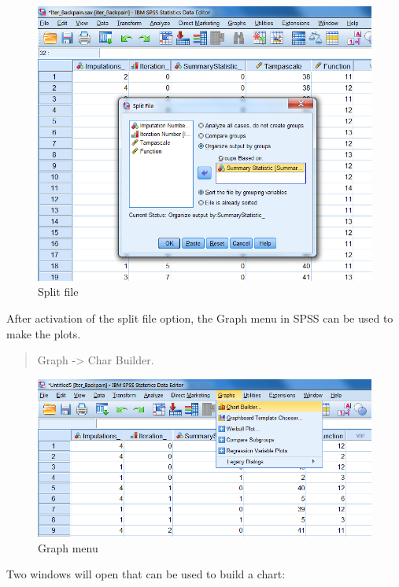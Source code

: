 \documentclass[]{book}
\begin{document}
\begin{figure}

{\centering \includegraphics[width=0.9\linewidth]{images/fig4.17} 

}

\caption{Split file}\label{fig:fig4-17}
\end{figure}

After activation of the split file option, the Graph menu in SPSS can be
used to make the plots.

\begin{quote}
Graph -\textgreater{} Char Builder.
\end{quote}

\begin{figure}

{\centering \includegraphics[width=0.9\linewidth]{images/fig4.13} 

}

\caption{Graph menu}\label{fig:fig4-13}
\end{figure}

Two windows will open that can be used to build a chart:
\end{document}
